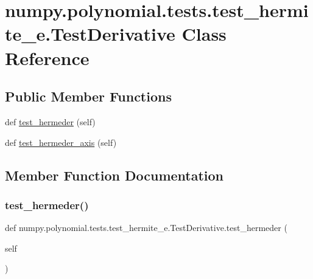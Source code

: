 \hypertarget{classnumpy_1_1polynomial_1_1tests_1_1test__hermite__e_1_1TestDerivative}{}\section{numpy.\+polynomial.\+tests.\+test\+\_\+hermite\+\_\+e.\+Test\+Derivative Class Reference}
\label{classnumpy_1_1polynomial_1_1tests_1_1test__hermite__e_1_1TestDerivative}
\subsection*{Public Member Functions}
\begin{DoxyCompactItemize}
\item 
def \hyperlink{classnumpy_1_1polynomial_1_1tests_1_1test__hermite__e_1_1TestDerivative_a350a6b3d3f8ae582d24b6c170fab04a7}{test\+\_\+hermeder} (self)
\item 
def \hyperlink{classnumpy_1_1polynomial_1_1tests_1_1test__hermite__e_1_1TestDerivative_ae03d5b62b25845471d642f70f931511e}{test\+\_\+hermeder\+\_\+axis} (self)
\end{DoxyCompactItemize}


\subsection{Member Function Documentation}
\mbox{\label{classnumpy_1_1polynomial_1_1tests_1_1test__hermite__e_1_1TestDerivative_a350a6b3d3f8ae582d24b6c170fab04a7}} 
\subsubsection{\texorpdfstring{test\+\_\+hermeder()}{test\_hermeder()}}
{\footnotesize\ttfamily def numpy.\+polynomial.\+tests.\+test\+\_\+hermite\+\_\+e.\+Test\+Derivative.\+test\+\_\+hermeder (\begin{DoxyParamCaption}\item[{}]{self }\end{DoxyParamCaption})}

